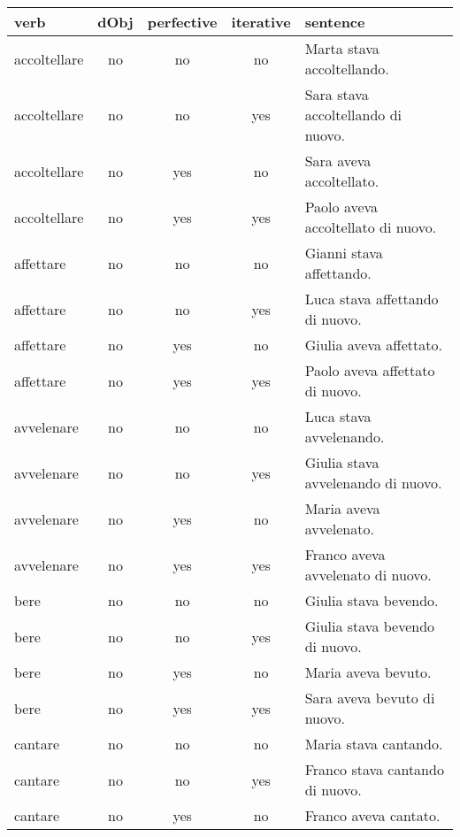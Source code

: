 \begin{longtable}{l|ccc|p{5cm}}
\textbf{verb}     & \textbf{dObj} & \textbf{perfective} & \textbf{iterative}    & \textbf{sentence} \\
\hline
\endhead
accoltellare   & no   & no         & no        & Marta stava accoltellando.            \\
accoltellare   & no   & no         & yes       & Sara stava accoltellando di nuovo.    \\
accoltellare   & no   & yes        & no        & Sara aveva accoltellato.              \\
accoltellare   & no   & yes        & yes       & Paolo aveva accoltellato di nuovo.    \\
affettare      & no   & no         & no        & Gianni stava affettando.              \\
affettare      & no   & no         & yes       & Luca stava affettando di nuovo.       \\
affettare      & no   & yes        & no        & Giulia aveva affettato.               \\
affettare      & no   & yes        & yes       & Paolo aveva affettato di nuovo.       \\
avvelenare     & no   & no         & no        & Luca stava avvelenando.               \\
avvelenare     & no   & no         & yes       & Giulia stava avvelenando di nuovo.    \\
avvelenare     & no   & yes        & no        & Maria aveva avvelenato.               \\
avvelenare     & no   & yes        & yes       & Franco aveva avvelenato di nuovo.     \\
bere           & no   & no         & no        & Giulia stava bevendo.                 \\
bere           & no   & no         & yes       & Giulia stava bevendo di nuovo.        \\
bere           & no   & yes        & no        & Maria aveva bevuto.                   \\
bere           & no   & yes        & yes       & Sara aveva bevuto di nuovo.           \\
cantare        & no   & no         & no        & Maria stava cantando.                 \\
cantare        & no   & no         & yes       & Franco stava cantando di nuovo.       \\
cantare        & no   & yes        & no        & Franco aveva cantato.                 \\

\end{longtable}

